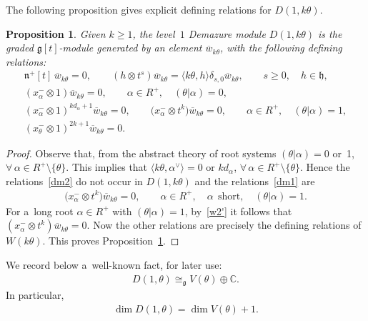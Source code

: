 \documentclass[11pt]{article}
\newtheorem{proposition}{Proposition}
\numberwithin{equation}{section}
\begin{document}
The following proposition gives explicit def\/ining relations for $D(1,k\theta)$.
\begin{proposition}
\label{WvsD}
Given $k\geq 1$, the level~$1$ Demazure module $D(1,k\theta)$ is the graded $\mathfrak{g}[t]$-module generated by an
element $\overline{w}_{k\theta}$, with the following defining relations:
\begin{gather*}
\mathfrak{n}^{+}[t]\, \overline{w}_{k\theta}=0,
\qquad
(h \otimes t^s) \overline{w}_{k\theta} = \langle k\theta, h\rangle \delta_{s,0} \overline{w}_{k\theta},
\qquad
s\geq0,
\quad
h\in\mathfrak{h},
\\
(x^{-}_{\alpha}\otimes 1) \overline{w}_{k\theta}=0,
\qquad
\alpha\in R^+,
\quad
(\theta|\alpha)=0,
\\
(x^{-}_{\alpha} \otimes 1)^{kd_{\alpha}+1} \overline{w}_{k\theta}=0,
\qquad
\big(x^{-}_{\alpha} \otimes t^k\big) \overline{w}_{k\theta}=0,
\qquad
\alpha\in R^+,
\quad
(\theta|\alpha)=1,
\\
(x^{-}_{\theta} \otimes 1)^{2k+1} \overline{w}_{k\theta}=0.
\end{gather*}
\end{proposition}
\begin{proof}
Observe that, from the abstract theory of root systems $(\theta|\alpha)= 0$ or~1,
$\forall\, \alpha \in R^{+}\setminus \{\theta\}$.
This implies that $\langle k\theta, \alpha^{\vee}\rangle = 0$ or $kd_{\alpha}$, $\forall\, \alpha \in R^{+}\setminus \{\theta\}$.
Hence the relations~\eqref{dm2} do not occur in $D(1,k\theta)$ and the relations~\eqref{dm1} are
\begin{gather*}
\big(x^{-}_{\alpha} \otimes t^k\big) \overline{w}_{k\theta}=0,
\qquad
\alpha\in R^+,
\quad
\alpha~~\text{short},
\quad
(\theta|\alpha)=1.
\end{gather*}
For a~long root $\alpha\in R^+$ with $(\theta|\alpha)=1$, by~\eqref{w2'} it follows that $(x^{-}_{\alpha} \otimes t^k) \overline{w}_{k\theta}=0$.
Now the other relations are precisely the def\/ining relations of $W(k\theta)$. This proves Proposition~\ref{WvsD}.
\end{proof}
We record below a~well-known fact, for later use:
\begin{gather*}
D(1, \theta)\cong_{\mathfrak{g}} V(\theta) \oplus \mathbb{C}.
\end{gather*}
In particular,
\begin{gather}
\label{dimd}
\dim D(1, \theta)= \dim V(\theta)+1.
\end{gather}
\end{document}
